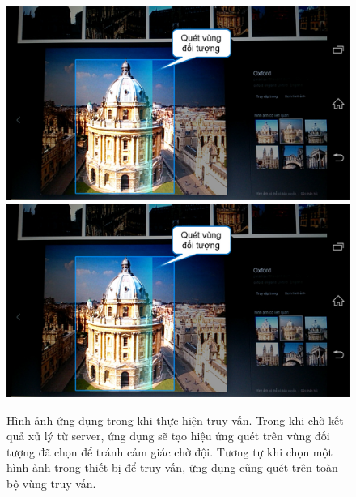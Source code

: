 \begin{figure}[!htbp]
  \begin{center}
    \leavevmode
    \ifpdf
      \includegraphics[scale=0.35]{interface_2}
    \else
      \includegraphics[scale=0.35]{interface_2}
    \fi
    \caption[Hình ảnh ứng dụng trong khi thực hiện truy vấn]{Hình ảnh ứng dụng trong khi thực hiện truy vấn. Trong khi chờ kết quả xử lý từ server, ứng dụng sẽ tạo hiệu ứng quét trên vùng đối tượng đã chọn để tránh cảm giác chờ đội. Tương tự khi chọn một hình ảnh trong thiết bị để truy vấn, ứng dụng cũng quét trên toàn bộ vùng truy vấn.}
    \label{FigInterface2}
  \end{center}
\end{figure}


